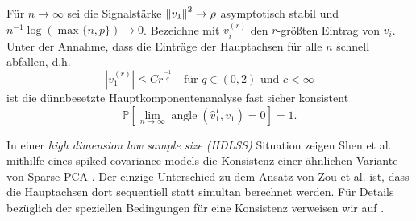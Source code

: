 \begin{thm}
Für $n \to \infty$ sei die Signalstärke $\left\lVert v_1 \right\rVert^2 \to \rho$ asymptotisch stabil und $n^{-1}\log(\max \{n,p\}) \to 0$. Bezeichne mit $v_i^{(r)}$ den $r$-größten Eintrag von $v_i$. Unter der Annahme, dass die Einträge der Hauptachsen für alle $n$ schnell abfallen, d.h.
$$|v_1^{(r)}| \leq Cr^{\frac{-1}{q}} \quad \text{für } q \in (0,2) \text{ und } c < \infty$$
ist die dünnbesetzte Hauptkomponentenanalyse fast sicher konsistent
$$\mathbb{P}\left[\lim_{n \to \infty} \operatorname{angle}(\widehat{v}_1^I, v_1) = 0\right] = 1.$$ 
\end{thm}

In einer \textit{high dimension low sample size (HDLSS)} Situation zeigen Shen et al. mithilfe eines spiked covariance models die Konsistenz einer ähnlichen Variante von Sparse PCA \cite{shen}. Der einzige Unterschied zu dem Ansatz von Zou et al. ist, dass die Hauptachsen dort sequentiell statt simultan berechnet werden. Für Details bezüglich der speziellen Bedingungen für eine Konsistenz verweisen wir auf \cite{shen_consistency}.